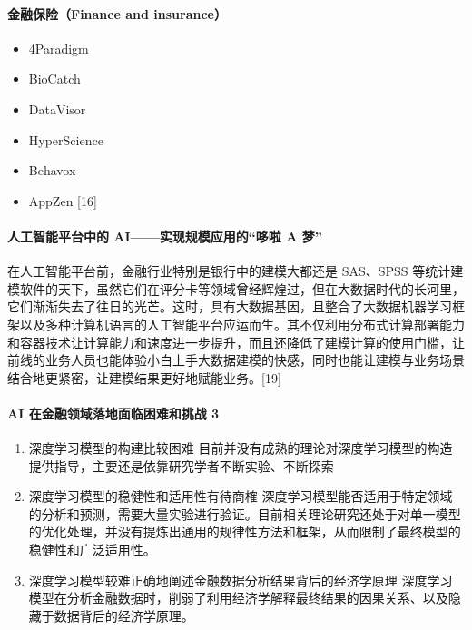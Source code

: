 \documentclass[letterpaper,11pt,english]{sphinxmanual}
\begin{document}
\paragraph{金融保险（Finance and insurance）}
\label{\detokenize{chapter_project/AI_Finance:finance-and-insurance}}\begin{itemize}
\item {} 
4Paradigm

\item {} 
BioCatch

\item {} 
DataVisor

\item {} 
HyperScience

\item {} 
Behavox

\item {} 
AppZen {[}16{]}

\end{itemize}


\paragraph{人工智能平台中的 AI——实现规模应用的“哆啦 A 梦”}
\label{\detokenize{chapter_project/AI_Finance:ai-a}}
在人工智能平台前，金融行业特别是银行中的建模大都还是 SAS、SPSS
等统计建模软件的天下，虽然它们在评分卡等领域曾经辉煌过，但在大数据时代的长河里，它们渐渐失去了往日的光芒。这时，具有大数据基因，且整合了大数据机器学习框架以及多种计算机语言的人工智能平台应运而生。其不仅利用分布式计算部署能力和容器技术让计算能力和速度进一步提升，而且还降低了建模计算的使用门槛，让前线的业务人员也能体验小白上手大数据建模的快感，同时也能让建模与业务场景结合地更紧密，让建模结果更好地赋能业务。{[}19{]}


\paragraph{AI 在金融领域落地面临困难和挑战 3\sphinxfootnotemark[682]}
\label{\detokenize{chapter_project/AI_Finance:ai-3}}%
\begin{footnotetext}[682]\sphinxAtStartFootnote
{}
%
\end{footnotetext}\ignorespaces \begin{enumerate}
%
\item {} 
深度学习模型的构建比较困难
目前并没有成熟的理论对深度学习模型的构造提供指导，主要还是依靠研究学者不断实验、不断探索

\item {} 
深度学习模型的稳健性和适用性有待商榷
深度学习模型能否适用于特定领域的分析和预测，需要大量实验进行验证。目前相关理论研究还处于对单一模型的优化处理，并没有提炼出通用的规律性方法和框架，从而限制了最终模型的稳健性和广泛适用性。

\item {} 
深度学习模型较难正确地阐述金融数据分析结果背后的经济学原理
深度学习模型在分析金融数据时，削弱了利用经济学解释最终结果的因果关系、以及隐藏于数据背后的经济学原理。

\end{enumerate}
\end{document}
